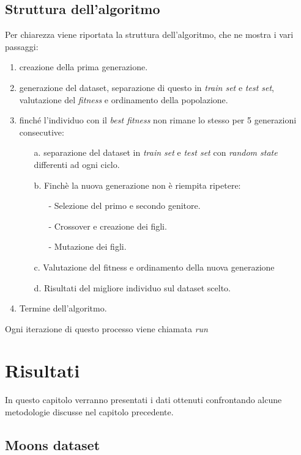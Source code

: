 \documentclass[12pt,a4paper]{report}
\begin{document}

\section{Struttura dell'algoritmo }

Per chiarezza viene riportata la struttura dell'algoritmo, che ne mostra i vari passaggi:

\begin{enumerate}
 \item creazione della prima generazione.
 \item generazione del dataset, separazione di questo in \textit{train set} e \textit{test set}, valutazione del \textit{fitness} e ordinamento della popolazione.
 \item finché l'individuo con il \textit{best fitness} non rimane lo stesso per 5 generazioni consecutive:
 \begin{enumerate}
  \item[a.] separazione del dataset in \textit{train set} e \textit{test set} con \textit{random state} differenti ad ogni ciclo.
  \item[b.] Finchè la nuova generazione non è riempita ripetere:
  \begin{enumerate}
   \item [-] Selezione del primo e secondo genitore.
   \item [-] Crossover e creazione dei figli.
   \item [-] Mutazione dei figli.
  \end{enumerate}
  \item [c.] Valutazione del fitness e ordinamento della nuova generazione
  \item [d.] Risultati del migliore individuo sul dataset scelto.
 \end{enumerate}
 \item Termine dell'algoritmo.
\end{enumerate}

Ogni iterazione di questo processo viene chiamata \textit{run}

\chapter{Risultati}

In questo capitolo verranno presentati i dati ottenuti confrontando alcune metodologie discusse nel capitolo precedente.

\section{Moons dataset}
\end{document}
